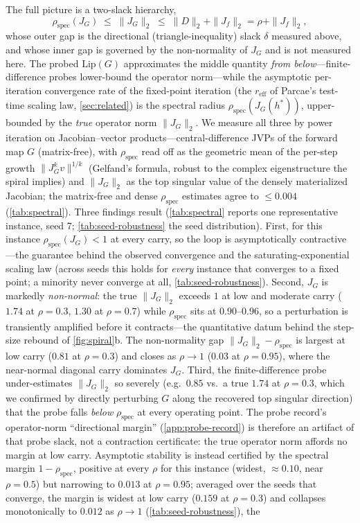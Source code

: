 \documentclass[11pt]{article}
\begin{document}
The full picture is a two-slack hierarchy,
\begin{equation}
\rho_{\text{spec}}(J_G) \;\le\; \|J_G\|_2 \;\le\; \|D\|_2 + \|J_f\|_2 = \rho + \|J_f\|_2,
\label{eq:hierarchy}
\end{equation}
whose outer gap is the directional (triangle-inequality) slack $\delta$ measured above, and whose inner gap is governed by the non-normality of $J_G$ and is not measured here. The probed $\text{Lip}(G)$ approximates the middle quantity \emph{from below}---finite-difference probes lower-bound the operator norm---while the asymptotic per-iteration convergence rate of the fixed-point iteration (the $r_\text{eff}$ of Parcae's test-time scaling law, \cref{sec:related}) is the spectral radius $\rho_{\text{spec}}(J_G(h^*))$, upper-bounded by the \emph{true} operator norm $\|J_G\|_2$. We measure all three by power iteration on Jacobian--vector products---central-difference JVPs of the forward map $G$ (matrix-free), with $\rho_{\text{spec}}$ read off as the geometric mean of the per-step growth $\|J_G^k v\|^{1/k}$ (Gelfand's formula, robust to the complex eigenstructure the spiral implies) and $\|J_G\|_2$ as the top singular value of the densely materialized Jacobian; the matrix-free and dense $\rho_{\text{spec}}$ estimates agree to $\le 0.004$ (\cref{tab:spectral}). Three findings result (\cref{tab:spectral} reports one representative instance, seed 7; \cref{tab:seed-robustness} the seed distribution). First, for this instance $\rho_{\text{spec}}(J_G) < 1$ at every carry, so the loop is asymptotically contractive---the guarantee behind the observed convergence and the saturating-exponential scaling law (across seeds this holds for \emph{every} instance that converges to a fixed point; a minority never converge at all, \cref{tab:seed-robustness}). Second, $J_G$ is markedly \emph{non-normal}: the true $\|J_G\|_2$ exceeds $1$ at low and moderate carry ($1.74$ at $\rho=0.3$, $1.30$ at $\rho=0.7$) while $\rho_{\text{spec}}$ sits at $0.90$--$0.96$, so a perturbation is transiently amplified before it contracts---the quantitative datum behind the step-size rebound of \cref{fig:spiral}b. The non-normality gap $\|J_G\|_2-\rho_{\text{spec}}$ is largest at low carry ($0.81$ at $\rho=0.3$) and closes as $\rho\to1$ ($0.03$ at $\rho=0.95$), where the near-normal diagonal carry dominates $J_G$. Third, the finite-difference probe under-estimates $\|J_G\|_2$ so severely (e.g.\ $0.85$ vs.\ a true $1.74$ at $\rho=0.3$, which we confirmed by directly perturbing $G$ along the recovered top singular direction) that the probe falls \emph{below} $\rho_{\text{spec}}$ at every operating point. The probe record's operator-norm ``directional margin'' (\cref{app:probe-record}) is therefore an artifact of that probe slack, not a contraction certificate: the true operator norm affords no margin at low carry. Asymptotic stability is instead certified by the spectral margin $1-\rho_{\text{spec}}$, positive at every $\rho$ for this instance (widest, $\approx 0.10$, near $\rho=0.5$) but narrowing to $0.013$ at $\rho=0.95$; averaged over the seeds that converge, the margin is widest at low carry ($0.159$ at $\rho=0.3$) and collapses monotonically to $0.012$ as $\rho \to 1$ (\cref{tab:seed-robustness}), the 
\end{document}
